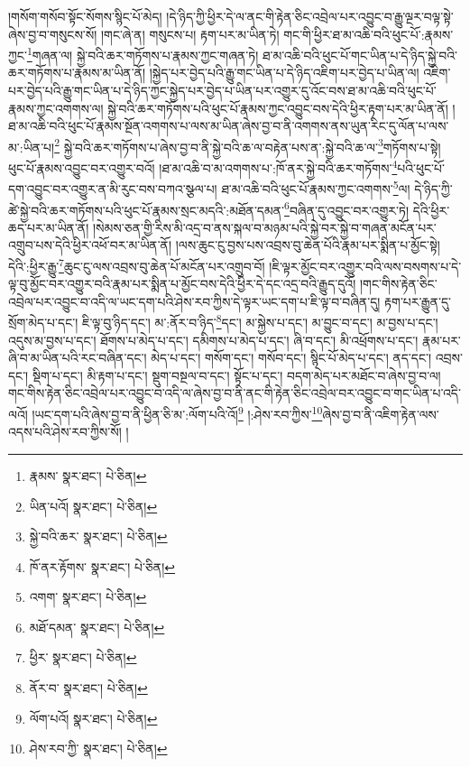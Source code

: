 །གསོག་གསོབ་སྟོང་སོགས་སྙིང་པོ་མེད། །དེ་ཉིད་ཀྱི་ཕྱིར་དེ་ལ་ནང་གི་རྟེན་ཅིང་འབྲེལ་པར་འབྱུང་བ་རྒྱུ་ལྔར་བལྟ་སྟེ་ཞེས་བྱ་བ་གསུངས་སོ། །གང་ཞེ་ན། གསུངས་པ། རྟག་པར་མ་ཡིན་ཏེ། གང་གི་ཕྱིར་ཐ་མ་འཆི་བའི་ཕུང་པོ་:རྣམས་ཀྱང་\footnote{རྣམས་  སྣར་ཐང་།  པེ་ཅིན། }གཞན་ལ། སྐྱེ་བའི་ཆར་གཏོགས་པ་རྣམས་ཀྱང་གཞན་ཏེ། ཐ་མ་འཆི་བའི་ཕུང་པོ་གང་ཡིན་པ་དེ་ཉིད་སྐྱེ་བའི་ཆར་གཏོགས་པ་རྣམས་མ་ཡིན་ནོ། །སྐྱེད་པར་བྱེད་པའི་རྒྱུ་གང་ཡིན་པ་དེ་ཉིད་འཇིག་པར་བྱེད་པ་ཡིན་ལ། འཇིག་པར་བྱེད་པའི་རྒྱུ་གང་ཡིན་པ་དེ་ཉིད་ཀྱང་སྐྱེད་པར་བྱེད་པ་ཡིན་པར་འགྱུར་དུ་འོང་བས་ཐ་མ་འཆི་བའི་ཕུང་པོ་རྣམས་ཀྱང་འགགས་ལ། སྐྱེ་བའི་ཆར་གཏོགས་པའི་ཕུང་པོ་རྣམས་ཀྱང་འབྱུང་བས་དེའི་ཕྱིར་རྟག་པར་མ་ཡིན་ནོ། །ཐ་མ་འཆི་བའི་ཕུང་པོ་རྣམས་སྔོན་འགགས་པ་ལས་མ་ཡིན་ཞེས་བྱ་བ་ནི་འགགས་ནས་ཡུན་རིང་དུ་ལོན་པ་ལས་མ་:ཡིན་པ།\footnote{ཡིན་པའོ།  སྣར་ཐང་།  པེ་ཅིན། } སྐྱེ་བའི་ཆར་གཏོགས་པ་ཞེས་བྱ་བ་ནི་སྐྱེ་བའི་ཆ་ལ་བརྟེན་པས་ན་:སྐྱེ་བའི་ཆ་ལ་\footnote{སྐྱེ་བའི་ཆར་  སྣར་ཐང་།  པེ་ཅིན། }གཏོགས་པ་སྟེ། ཕུང་པོ་རྣམས་འབྱུང་བར་འགྱུར་བའོ། །ཐ་མ་འཆི་བ་མ་འགགས་པ་:ཁོ་ནར་སྐྱེ་བའི་ཆར་གཏོགས་\footnote{ཁོ་ནར་རྟོགས་  སྣར་ཐང་།  པེ་ཅིན། }པའི་ཕུང་པོ་དག་འབྱུང་བར་འགྱུར་ན་མི་རུང་བས་བཀའ་སྩལ་པ། ཐ་མ་འཆི་བའི་ཕུང་པོ་རྣམས་ཀྱང་འགགས་\footnote{འགག་  སྣར་ཐང་།  པེ་ཅིན། }ལ། དེ་ཉིད་ཀྱི་ཚེ་སྐྱེ་བའི་ཆར་གཏོགས་པའི་ཕུང་པོ་རྣམས་སྲང་མདའི་:མཐོན་དམན་\footnote{མཐོ་དམན་  སྣར་ཐང་།  པེ་ཅིན། }བཞིན་དུ་འབྱུང་བར་འགྱུར་ཏེ། དེའི་ཕྱིར་ཆད་པར་མ་ཡིན་ནོ། །སེམས་ཅན་གྱི་རིས་མི་འདྲ་བ་ནས་སྐལ་བ་མཉམ་པའི་སྐྱེ་བར་སྐྱེ་བ་གཞན་མངོན་པར་འགྲུབ་པས་དེའི་ཕྱིར་འཕོ་བར་མ་ཡིན་ནོ། །ལས་ཆུང་ངུ་བྱས་པས་འབྲས་བུ་ཆེན་པོའི་རྣམ་པར་སྨིན་པ་མྱོང་སྟེ། དེའི་:ཕྱིར་རྒྱུ་\footnote{ཕྱིར་  སྣར་ཐང་།  པེ་ཅིན། }ཆུང་ངུ་ལས་འབྲས་བུ་ཆེན་པོ་མངོན་པར་འགྲུབ་བོ། །ཇི་ལྟར་མྱོང་བར་འགྱུར་བའི་ལས་བསགས་པ་དེ་ལྟ་བུ་མྱོང་བར་འགྱུར་བའི་རྣམ་པར་སྨིན་པ་མྱོང་བས་དེའི་ཕྱིར་དེ་དང་འདྲ་བའི་རྒྱུད་དུའོ། །གང་གིས་རྟེན་ཅིང་འབྲེལ་པར་འབྱུང་བ་འདི་ལ་ཡང་དག་པའི་ཤེས་རབ་ཀྱིས་དེ་ལྟར་ཡང་དག་པ་ཇི་ལྟ་བ་བཞིན་དུ། རྟག་པར་རྒྱུན་དུ་སྲོག་མེད་པ་དང་། ཇི་ལྟ་བུ་ཉིད་དང་། མ་:ནོར་བ་ཉིད་\footnote{ནོར་བ་  སྣར་ཐང་།  པེ་ཅིན། }དང་། མ་སྐྱེས་པ་དང་། མ་བྱུང་བ་དང་། མ་བྱས་པ་དང་། འདུས་མ་བྱས་པ་དང་། ཐོགས་པ་མེད་པ་དང་། དམིགས་པ་མེད་པ་དང་། ཞི་བ་དང་། མི་འཕྲོགས་པ་དང་། རྣམ་པར་ཞི་བ་མ་ཡིན་པའི་རང་བཞིན་དང་། མེད་པ་དང་། གསོག་དང་། གསོབ་དང་། སྙིང་པོ་མེད་པ་དང་། ནད་དང་། འབྲས་དང་། སྡིག་པ་དང་། མི་རྟག་པ་དང་། སྡུག་བསྔལ་བ་དང་། སྟོང་པ་དང་། བདག་མེད་པར་མཐོང་བ་ཞེས་བྱ་བ་ལ། གང་གིས་རྟེན་ཅིང་འབྲེལ་པར་འབྱུང་བ་འདི་ལ་ཞེས་བྱ་བ་ནི་ནང་གི་རྟེན་ཅིང་འབྲེལ་བར་འབྱུང་བ་གང་ཡིན་པ་འདི་ལའོ། །ཡང་དག་པའི་ཞེས་བྱ་བ་ནི་ཕྱིན་ཅི་མ་:ལོག་པའི་འོ།\footnote{ལོག་པའོ།  སྣར་ཐང་།  པེ་ཅིན། } །:ཤེས་རབ་ཀྱིས་\footnote{ཤེས་རབ་ཀྱི་  སྣར་ཐང་།  པེ་ཅིན། }ཞེས་བྱ་བ་ནི་འཇིག་རྟེན་ལས་འདས་པའི་ཤེས་རབ་ཀྱིས་སོ། །
